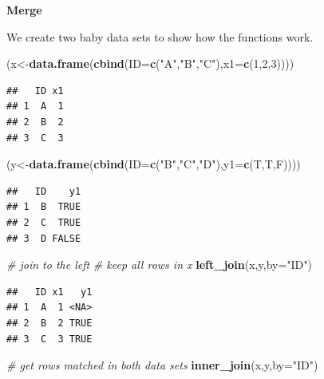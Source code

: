\documentclass[]{book}
\newenvironment{Shaded}{\begin{snugshade}}{\end{snugshade}}
\newcommand{\KeywordTok}[1]{\textcolor[rgb]{0.13,0.29,0.53}{\textbf{{#1}}}}
\newcommand{\DataTypeTok}[1]{\textcolor[rgb]{0.13,0.29,0.53}{{#1}}}
\newcommand{\DecValTok}[1]{\textcolor[rgb]{0.00,0.00,0.81}{{#1}}}
\newcommand{\StringTok}[1]{\textcolor[rgb]{0.31,0.60,0.02}{{#1}}}
\newcommand{\CommentTok}[1]{\textcolor[rgb]{0.56,0.35,0.01}{\textit{{#1}}}}
\newcommand{\NormalTok}[1]{{#1}}
\theoremstyle{definition}
\theoremstyle{definition}
\theoremstyle{remark}
\begin{document}
\textbf{Merge}

We create two baby data sets to show how the functions work.

\begin{Shaded}
\begin{Highlighting}[]
\NormalTok{(x<-}\KeywordTok{data.frame}\NormalTok{(}\KeywordTok{cbind}\NormalTok{(}\DataTypeTok{ID=}\KeywordTok{c}\NormalTok{(}\StringTok{"A"}\NormalTok{,}\StringTok{"B"}\NormalTok{,}\StringTok{"C"}\NormalTok{),}\DataTypeTok{x1=}\KeywordTok{c}\NormalTok{(}\DecValTok{1}\NormalTok{,}\DecValTok{2}\NormalTok{,}\DecValTok{3}\NormalTok{))))}
\end{Highlighting}
\end{Shaded}

\begin{verbatim}
##   ID x1
## 1  A  1
## 2  B  2
## 3  C  3
\end{verbatim}

\begin{Shaded}
\begin{Highlighting}[]
\NormalTok{(y<-}\KeywordTok{data.frame}\NormalTok{(}\KeywordTok{cbind}\NormalTok{(}\DataTypeTok{ID=}\KeywordTok{c}\NormalTok{(}\StringTok{"B"}\NormalTok{,}\StringTok{"C"}\NormalTok{,}\StringTok{"D"}\NormalTok{),}\DataTypeTok{y1=}\KeywordTok{c}\NormalTok{(T,T,F))))}
\end{Highlighting}
\end{Shaded}

\begin{verbatim}
##   ID    y1
## 1  B  TRUE
## 2  C  TRUE
## 3  D FALSE
\end{verbatim}

\begin{Shaded}
\begin{Highlighting}[]
\CommentTok{# join to the left}
\CommentTok{# keep all rows in x}
\KeywordTok{left_join}\NormalTok{(x,y,}\DataTypeTok{by=}\StringTok{"ID"}\NormalTok{)}
\end{Highlighting}
\end{Shaded}

\begin{verbatim}
##   ID x1   y1
## 1  A  1 <NA>
## 2  B  2 TRUE
## 3  C  3 TRUE
\end{verbatim}

\begin{Shaded}
\begin{Highlighting}[]
\CommentTok{# get rows matched in both data sets}
\KeywordTok{inner_join}\NormalTok{(x,y,}\DataTypeTok{by=}\StringTok{"ID"}\NormalTok{)}
\end{Highlighting}
\end{Shaded}
\end{document}

